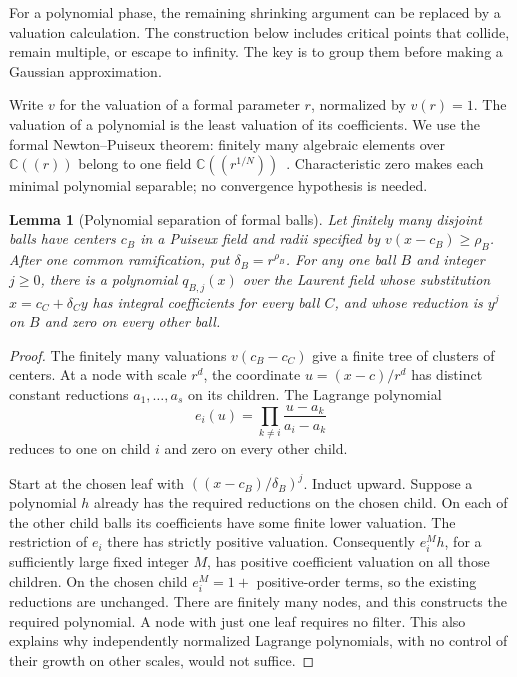 \documentclass[11pt]{article}
\newtheorem{lemma}[theorem]{Lemma}
\theoremstyle{definition}\newtheorem{definition}[theorem]{Definition}
\theoremstyle{remark}\newtheorem{remark}[theorem]{Remark}
\newcommand{\C}{\mathbb C}
\begin{document}
For a polynomial phase, the remaining shrinking argument can be
replaced by a valuation calculation. The construction below includes
critical points that collide, remain multiple, or escape to infinity.
The key is to group them before making a Gaussian approximation.

Write $v$ for the valuation of a formal parameter $r$, normalized by
$v(r)=1$. The valuation of a polynomial is the least valuation of its
coefficients. We use the formal Newton--Puiseux theorem: finitely many
algebraic elements over $\C((r))$ belong to one field
$\C((r^{1/N}))$~\cite[Corollary~1.10]{MannaaCoquand}.
Characteristic zero makes each minimal polynomial separable;
no convergence hypothesis is needed.

\begin{lemma}[Polynomial separation of formal balls]\label{lem:ballseparation}
Let finitely many disjoint balls have centers $c_B$ in a Puiseux field
and radii specified by $v(x-c_B)\geq\rho_B$. After one common
ramification, put $\delta_B=r^{\rho_B}$. For any one ball $B$ and
integer $j\geq0$, there is a polynomial $q_{B,j}(x)$ over the Laurent
field whose substitution $x=c_C+\delta_C y$ has integral coefficients
for every ball $C$, and whose reduction is $y^j$ on $B$ and zero on
every other ball.
\end{lemma}
\begin{proof}
The finitely many valuations $v(c_B-c_C)$ give a finite tree of
clusters of centers. At a node with scale $r^d$, the coordinate
$u=(x-c)/r^d$ has distinct constant reductions $a_1,\ldots,a_s$
on its children. The Lagrange polynomial
\[
 e_i(u)=\prod_{k\ne i}\frac{u-a_k}{a_i-a_k}
\]
reduces to one on child $i$ and zero on every other child.

Start at the chosen leaf with $((x-c_B)/\delta_B)^j$. Induct upward.
Suppose a polynomial $h$ already has the required reductions on the
chosen child. On each of the other child balls its coefficients have
some finite lower valuation. The restriction of $e_i$ there has
strictly positive valuation. Consequently $e_i^M h$, for a sufficiently
large fixed integer $M$, has positive coefficient valuation on all
those children. On the chosen child $e_i^M=1+$ positive-order terms,
so the existing reductions are unchanged. There are finitely many
nodes, and this constructs the required polynomial. A node with just
one leaf requires no filter. This also explains why independently
normalized Lagrange polynomials, with no control of their growth on
other scales, would not suffice.
\end{proof}
\end{document}

